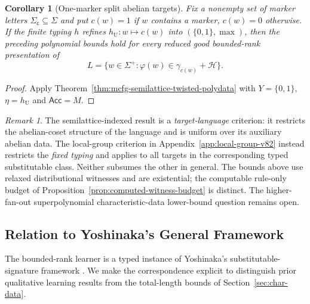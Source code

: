 \documentclass[11pt]{article}
\numberwithin{equation}{section}
\theoremstyle{plain}
\newtheorem{corollary}[theorem]{Corollary}
\theoremstyle{definition}
\theoremstyle{remark}
\newtheorem{remark}[theorem]{Remark}
\theoremstyle{plain}
\begin{document}
\begin{corollary}[One-marker split abelian targets]
\label{cor:mcfg-one-marker-split-polydata}
Fix a nonempty set of marker letters
$\Sigma_{\mathsf c}\subseteq\Sigma$ and put
$c(w)=1$ if $w$ contains a marker, $c(w)=0$ otherwise.
If the finite typing $h$ refines
$h_{\mathrm U}:w\mapsto c(w)$ into
$(\{0,1\},\max)$, then the preceding polynomial
bounds hold for every reduced good bounded-rank
presentation of
\[
 L=\{w\in\Sigma^+:
      \varphi(w)\in\gamma_{c(w)}+\mathcal H\}.
\]
\end{corollary}
\begin{proof}
Apply Theorem~\ref{thm:mcfg-semilattice-twisted-polydata}
with $Y=\{0,1\}$, $\eta=h_{\mathrm U}$ and
$\mathsf{Acc}=M$.
\end{proof}

\begin{remark}
The semilattice-indexed result is a
\emph{target-language} criterion: it restricts the
abelian-coset structure of the language and is uniform
over its auxiliary abelian data. The local-group
criterion in Appendix~\ref{app:local-group-v82} instead
restricts the \emph{fixed typing} and applies to all
targets in the corresponding typed substitutable class.
Neither subsumes the other in general.
The bounds above use relaxed distributional witnesses
and are existential; the computable rule-only budget of
Proposition~\ref{prop:computed-witness-budget} is distinct.
The higher-fan-out superpolynomial characteristic-data
lower-bound question remains open.
\end{remark}



\subsection{Relation to Yoshinaka's General Framework}
\label{sec:general-framework}

The bounded-rank learner is a typed instance of
Yoshinaka's substitutable-signature framework
\cite{Yoshinaka2015General}. We make the
correspondence explicit to distinguish prior
qualitative learning results from the total-length
bounds of Section~\ref{sec:char-data}.
\end{document}
